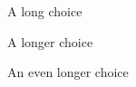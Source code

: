 \begin{multichoice}[before=\hspace{3em},itemjoin=\hspace{3em},label=\bf\arabic*{})]
\item  A long choice 
\item A longer choice\\\hspace*{9em}
\item An even longer choice
\end{multichoice}